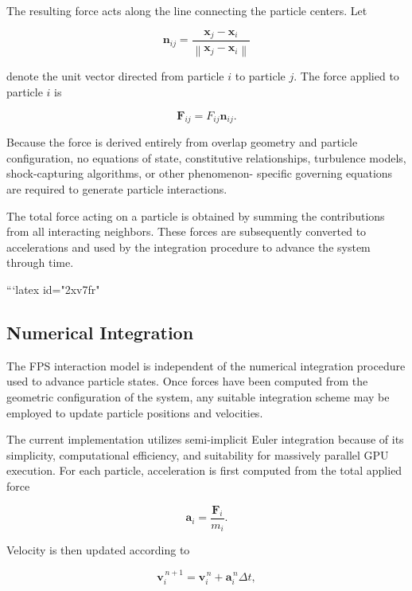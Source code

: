 The resulting force acts along the line connecting the
particle centers. Let

\begin{equation}
\mathbf{n}_{ij}
=
\frac{\mathbf{x}_{j}-\mathbf{x}_{i}}
{\left\|\mathbf{x}_{j}-\mathbf{x}_{i}\right\|}
\end{equation}

denote the unit vector directed from particle $i$ to
particle $j$. The force applied to particle $i$ is

\begin{equation}
\mathbf{F}_{ij}
=
F_{ij}\mathbf{n}_{ij}.
\end{equation}

Because the force is derived entirely from overlap
geometry and particle configuration, no equations of
state, constitutive relationships, turbulence models,
shock-capturing algorithms, or other phenomenon-
specific governing equations are required to generate
particle interactions.

The total force acting on a particle is obtained by
summing the contributions from all interacting
neighbors. These forces are subsequently converted to
accelerations and used by the integration procedure to
advance the system through time.

```latex id="2xv7fr"
\subsection{Numerical Integration}

The FPS interaction model is independent of the numerical
integration procedure used to advance particle states.
Once forces have been computed from the geometric
configuration of the system, any suitable integration
scheme may be employed to update particle positions and
velocities.

The current implementation utilizes semi-implicit Euler
integration because of its simplicity, computational
efficiency, and suitability for massively parallel GPU
execution. For each particle, acceleration is first
computed from the total applied force

\begin{equation}
\mathbf{a}_i=\frac{\mathbf{F}_i}{m_i}.
\end{equation}

Velocity is then updated according to

\begin{equation}
\mathbf{v}_i^{\,n+1}
=
\mathbf{v}_i^{\,n}
+
\mathbf{a}_i^{\,n}\Delta t,
\end{equation}

